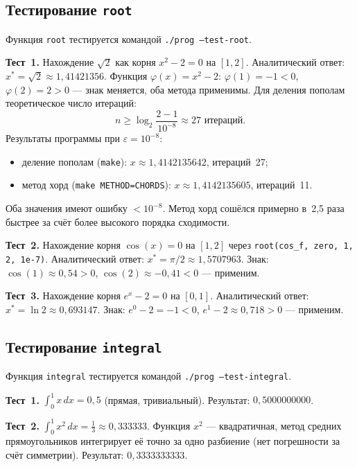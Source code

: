 \documentclass[a4paper,12pt,titlepage,finall]{article}
\begin{document}
\subsection{Тестирование \texttt{root}}

Функция \texttt{root} тестируется командой \texttt{./prog --test-root}.

\textbf{Тест~1.} Нахождение $\sqrt{2}$ как корня $x^2 - 2 = 0$ на $[1, 2]$.
Аналитический ответ: $x^* = \sqrt{2} \approx 1{,}41421356$. Функция $\varphi(x) = x^2 - 2$:
$\varphi(1) = -1 < 0$, $\varphi(2) = 2 > 0$ --- знак меняется, оба метода применимы.
Для деления пополам теоретическое число итераций:
\[
    n \geq \log_2\frac{2-1}{10^{-8}} \approx 27 \text{ итераций.}
\]
Результаты программы при $\varepsilon = 10^{-8}$:
\begin{itemize}
    \item деление пополам (\texttt{make}): $x \approx 1{,}4142135642$, итераций~27;
    \item метод хорд (\texttt{make METHOD=CHORDS}): $x \approx 1{,}4142135605$, итераций~11.
\end{itemize}
Оба значения имеют ошибку $< 10^{-8}$. Метод хорд сошёлся примерно в~2{,}5 раза
быстрее за счёт более высокого порядка сходимости.

\textbf{Тест~2.} Нахождение корня $\cos(x) = 0$ на $[1, 2]$ через \texttt{root(cos\_f, zero, 1, 2, 1e-7)}.
Аналитический ответ: $x^* = \pi/2 \approx 1{,}5707963$. Знак: $\cos(1) \approx 0{,}54 > 0$,
$\cos(2) \approx -0{,}41 < 0$ --- применим.

\textbf{Тест~3.} Нахождение корня $e^x - 2 = 0$ на $[0, 1]$.
Аналитический ответ: $x^* = \ln 2 \approx 0{,}693147$. Знак:
$e^0 - 2 = -1 < 0$, $e^1 - 2 \approx 0{,}718 > 0$ --- применим.

\subsection{Тестирование \texttt{integral}}

Функция \texttt{integral} тестируется командой \texttt{./prog --test-integral}.

\textbf{Тест~1.} $\displaystyle\int_0^1 x\,dx = 0{,}5$ (прямая, тривиальный). Результат: $0{,}5000000000$.

\textbf{Тест~2.} $\displaystyle\int_0^1 x^2\,dx = \tfrac{1}{3} \approx 0{,}333333$.
Функция $x^2$ --- квадратичная, метод средних прямоугольников интегрирует её точно
за одно разбиение (нет погрешности за счёт симметрии). Результат: $0{,}3333333333$.
\end{document}
